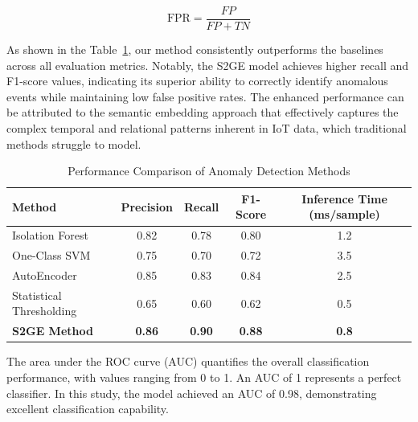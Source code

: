 \begin{ZhChapter}
    \begin{equation}
        \text{FPR} = \frac{FP}{FP + TN}
    \end{equation}


    As shown in the Table~\ref{tab:performance_comparison}, our method consistently outperforms the baselines across all evaluation metrics. Notably, the S2GE model achieves higher recall and F1-score values, indicating its superior ability to correctly identify anomalous events while maintaining low false positive rates. The enhanced performance can be attributed to the semantic embedding approach that effectively captures the complex temporal and relational patterns inherent in IoT data, which traditional methods struggle to model.



    \begin{table}[htbp]
        \centering
        \caption{Performance Comparison of Anomaly Detection Methods}
        \vspace{1em}
        \label{tab:performance_comparison}
        \begin{tabular}{|l|c|c|c|c|}
            \hline
            \textbf{Method}                              & \textbf{Precision} & \textbf{Recall} & \textbf{F1-Score} & \textbf{Inference Time (ms/sample)} \\
            \hline
            Isolation Forest~\cite{liu2008isolation}     & 0.82               & 0.78            & 0.80              & 1.2                                 \\
            One-Class SVM~\cite{scholkopf2001estimating} & 0.75               & 0.70            & 0.72              & 3.5                                 \\
            AutoEncoder~\cite{sakurada2014anomaly}       & 0.85               & 0.83            & 0.84              & 2.5                                 \\
            Statistical Thresholding                     & 0.65               & 0.60            & 0.62              & 0.5                                 \\
            \hline
            \textbf{S2GE Method}                         & \textbf{0.86}      & \textbf{0.90}   & \textbf{0.88}     & \textbf{0.8}                        \\
            \hline
        \end{tabular}
    \end{table}





    The area under the ROC curve (AUC) quantifies the overall classification performance, with values ranging from 0 to 1. An AUC of 1 represents a perfect classifier. In this study, the model achieved an AUC of 0.98, demonstrating excellent classification capability.




\end{ZhChapter}